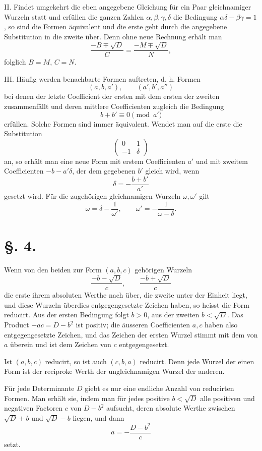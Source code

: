 \documentclass[11pt]{article}
\begin{document}
II. Findet umgekehrt die eben angegebene Gleichung für ein Paar gleichnamiger Wurzeln statt und erfüllen die ganzen Zahlen $\alpha,\beta,\gamma,\delta$ die Bedingung $\alpha\delta-\beta\gamma=1$, so sind die Formen äquivalent und die erste geht durch die angegebene Substitution in die zweite über. Denn ohne neue Rechnung erhält man
\[
 \frac{-B\mp\sqrt D}{C}=\frac{-M\mp\sqrt D}{N},
\]
folglich $B=M$, $C=N$.

III. Häufig werden benachbarte Formen auftreten, d. h. Formen
\[
 (a,b,a'),
 \qquad
 (a',b',a'')
\]
bei denen der letzte Coefficient der ersten mit dem ersten der zweiten zusammenfällt und deren mittlere Coefficienten zugleich die Bedingung
\[
 b+b'\equiv0\pmod {a'}
\]
erfüllen. Solche Formen sind immer äquivalent. Wendet man auf die erste die Substitution
\[
 \begin{pmatrix}0&1\\-1&\delta\end{pmatrix}
\]
an, so erhält man eine neue Form mit erstem Coefficienten $a'$ und mit zweitem Coefficienten $-b-a'\delta$, der dem gegebenen $b'$ gleich wird, wenn
\[
 \delta=-\frac{b+b'}{a'}
\]
gesetzt wird. Für die zugehörigen gleichnamigen Wurzeln $\omega,\omega'$ gilt
\[
 \omega=\delta-\frac1{\omega'},
 \qquad
 \omega'=-\frac1{\omega-\delta}.
\]

\section*{\S. 4.}

Wenn von den beiden zur Form $(a,b,c)$ gehörigen Wurzeln
\[
 \frac{-b-\sqrt D}{c},
 \qquad
 \frac{-b+\sqrt D}{c}
\]
die erste ihrem absoluten Werthe nach über, die zweite unter der Einheit liegt, und diese Wurzeln überdies entgegengesetzte Zeichen haben, so heisst die Form reducirt. Aus der ersten Bedingung folgt $b>0$, aus der zweiten $b<\sqrt D$. Das Product $-ac=D-b^2$ ist positiv; die äusseren Coefficienten $a,c$ haben also entgegengesetzte Zeichen, und das Zeichen der ersten Wurzel stimmt mit dem von $a$ überein und ist dem Zeichen von $c$ entgegengesetzt.

Ist $(a,b,c)$ reducirt, so ist auch $(c,b,a)$ reducirt. Denn jede Wurzel der einen Form ist der reciproke Werth der ungleichnamigen Wurzel der anderen.

Für jede Determinante $D$ giebt es nur eine endliche Anzahl von reducirten Formen. Man erhält sie, indem man für jedes positive $b<\sqrt D$ alle positiven und negativen Factoren $c$ von $D-b^2$ aufsucht, deren absolute Werthe zwischen $\sqrt D+b$ und $\sqrt D-b$ liegen, und dann
\[
 a=-\frac{D-b^2}{c}
\]
setzt.
\end{document}
